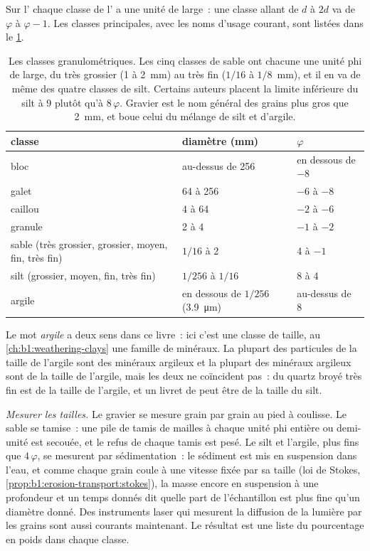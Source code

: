 Sur l' chaque classe de l' a une unité de large~: une classe
allant de $d$ à $2d$ va de $\varphi$ à $\varphi - 1$. Les classes principales,
avec les noms d'usage courant, sont listées dans le \cref{tab:b1:clastic-sediments:classes}.

\begin{table}[htbp]
\centering\small
\begin{tabular}{@{}lll@{}}
\hline
classe & diamètre (\si{mm}) & $\varphi$ \\
\hline
bloc & au-dessus de 256 & en dessous de $-8$ \\
galet & 64 à 256 & $-6$ à $-8$ \\
caillou & 4 à 64 & $-2$ à $-6$ \\
granule & 2 à 4 & $-1$ à $-2$ \\
sable (très grossier, grossier, moyen, fin, très fin) & $1/16$ à 2 & 4 à $-1$ \\
silt (grossier, moyen, fin, très fin) & $1/256$ à $1/16$ & 8 à 4 \\
argile & en dessous de $1/256$ (\qty{3.9}{\micro m}) & au-dessus de 8 \\
\hline
\end{tabular}
\caption{Les classes granulométriques. Les cinq classes de sable ont chacune une unité phi
de large, du très grossier (1 à \qty{2}{mm}) au très fin ($1/16$ à
$1/8$~mm), et il en va de même des quatre classes de silt. Certains auteurs placent la
limite inférieure du silt à 9 plutôt qu'à $8\,\varphi$. Gravier est le nom général des
grains plus gros que \qty{2}{mm}, et boue celui du mélange de silt et d'argile.}
\label{tab:b1:clastic-sediments:classes}
\end{table}

Le mot \emph{argile} a deux sens dans ce livre~: ici c'est une classe de taille, au
\cref{ch:b1:weathering-clays} une famille de minéraux. La plupart des particules de la taille de l'argile
sont des minéraux argileux et la plupart des minéraux argileux sont de la taille de l'argile, mais les deux ne
coïncident pas~: du quartz broyé très fin est de la taille de l'argile, et un livret de  peut être
de la taille du silt.

\emph{Mesurer les tailles.} Le gravier se mesure grain par grain au pied à coulisse.
Le sable se tamise~: une pile de tamis de mailles à chaque unité phi entière ou demi-unité
est secouée, et le refus de chaque tamis est pesé. Le silt et l'argile, plus fins que
$4\,\varphi$, se mesurent par sédimentation~: le sédiment est mis en suspension dans l'eau, et
comme chaque grain coule à une vitesse fixée par sa taille (loi de Stokes,
\cref{prop:b1:erosion-transport:stokes}), la masse encore en suspension à une
profondeur et un temps donnés dit quelle part de l'échantillon est plus fine qu'un
diamètre donné. Des instruments laser qui mesurent la diffusion de la lumière par les grains
sont aussi courants maintenant. Le résultat est une liste du pourcentage en poids dans chaque classe.

